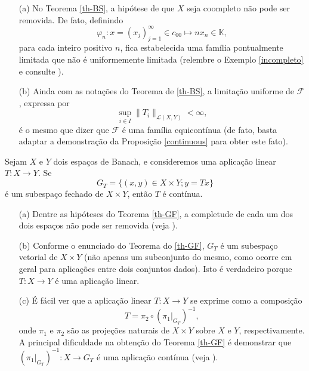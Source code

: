\begin{remark}
\begin{itemize}
\item[(a)] No Teorema \ref{th-BS}, a hipótese de que $X$ seja coompleto não pode ser removida. De fato, definindo 
\[
\displaystyle \varphi_n : x=(x_j)_{j=1}^{\infty} \in c_{00} \longmapsto nx_n \in \mathbb K ,
\]
para cada inteiro positivo $n$, fica estabelecida uma família pontualmente limitada que não é uniformemente limitada (relembre o Exemplo \ref{incompleto} e consulte \cite{pombo1999introduccao}).
\item[(b)] Ainda com as notações do Teorema de \ref{th-BS}, a limitação uniforme de $\mathcal F$, expressa por 
\[
\sup_{i\in I}\|T_i\|_{\mathcal{L}(X,Y)}<\infty ,
\]
é o mesmo que dizer que $\mathcal F$ é uma família equicontínua (de fato, basta adaptar a demonstração da Proposição \ref{continuous} para obter este fato).
\end{itemize}
\end{remark}

\begin{theorem}\label{th-GF}
    Sejam $X$ e $Y$ dois espaços de Banach, e consideremos uma aplicação linear $T:X\longrightarrow Y$. Se
    \[
    \displaystyle G_T = \{ (x,y)\in X\times Y; y=Tx\}
    \]
    é um subespaço fechado de $X\times Y$, então $T$ é contínua.
\end{theorem}

\begin{remark}
    \begin{itemize}
    \item[(a)] Dentre as hipóteses do Teorema \ref{th-GF}, a completude de cada um dos dois espaços não pode ser removida (veja \cite{pombo1999introduccao}).
    \item[(b)] Conforme o enunciado do Teorema do \ref{th-GF}, $G_T$ é um subespaço vetorial de $X\times Y$ (não apenas um subconjunto do mesmo, como ocorre em geral para aplicações entre dois conjuntos dados). Isto é verdadeiro porque $T:X\longrightarrow Y$ é uma aplicação linear. 
    \item[(c)] É fácil ver que a aplicação linear $T:X\longrightarrow Y$ se exprime como a composição
    \[
    T=\pi_2 \circ (\pi_1 |_{G_T})^{-1},
    \]
    onde $\pi_1$ e $\pi_2$ são as projeções naturais de $X\times Y$ sobre $X$ e $Y$, respectivamente. A principal dificuldade na obtenção do Teorema \ref{th-GF} é demonstrar que $(\pi_1 |_{G_T})^{-1}: X\longrightarrow G_T$ é uma aplicação contínua (veja \cite{pombo1999introduccao}).
    \end{itemize}
\end{remark}
